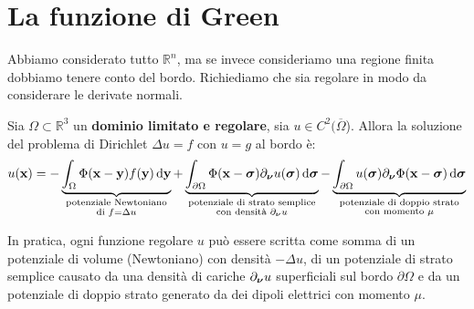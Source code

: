\section{La funzione di Green}
Abbiamo considerato tutto $\mathbb{R} ^{n} $, ma se invece consideriamo una regione finita dobbiamo tenere conto del bordo. Richiediamo che sia regolare in modo da considerare le derivate normali.
\begin{theorem}
    Sia $\displaystyle \Omega \subset \mathbb{R}^{3}$ un \textbf{dominio limitato e regolare}, sia $\displaystyle u\in C^{2}(\overline{\Omega }$). Allora la soluzione del problema di Dirichlet $\Delta u=f$ con $u=g$ al bordo è:
    \begin{equation*}
        u(\mathbf{x})=-\underbrace{\int _{\Omega } \Phi (\mathbf{x}-\mathbf{y}) f(\mathbf{y}) \,\mathrm d \mathbf{y}}_{\substack{\text{potenziale Newtoniano}\\\text{di } f=\Delta u}}
        +\underbrace{\int _{\partial \Omega } \Phi (\mathbf{x}-\bm{\sigma}) \partial _{\bm{\nu}} u(\bm{\sigma}) \,\mathrm d \bm{\sigma} }_{\substack{\text{potenziale di strato semplice}\\\text{con densità }\partial _{\bm{\nu}} u}}
        -\underbrace{\int _{\partial \Omega } u(\bm{\sigma}) \partial _{\bm{\nu}} \Phi (\mathbf{x}-\bm{\sigma}) \,\mathrm d \bm{\sigma} }_{ \substack{\text{potenziale di doppio strato}\\\text{con momento }\mu}}
    \end{equation*}
\end{theorem}
In pratica, ogni funzione regolare $u$ può essere scritta come somma di un potenziale di volume (Newtoniano) con densità $\displaystyle -\Delta u$, di un potenziale di strato semplice causato da una densità di cariche $\displaystyle \partial _{\bm{\nu}} u$ superficiali sul bordo $\displaystyle \partial \Omega $ e da un potenziale di doppio strato generato da dei dipoli elettrici con momento $\mu $.

